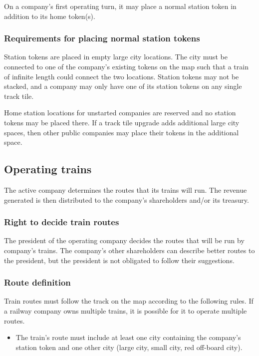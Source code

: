 \documentclass{article}
\begin{document}
\begin{CJK}{UTF8}{min}
\begin{multicols}{2}
On a company's first operating turn, it may place a normal station
token in addition to its home token(s).

\subsubsection{Requirements for placing normal station tokens}
\label{or-station-placement-requirements}
Station tokens are placed in empty large city locations. The city must
be connected to one of the company's existing tokens on the map such
that a train of infinite length could connect the two
locations. Station tokens may not be stacked, and a company may only
have one of its station tokens on any single track tile.

Home station locations for unstarted companies are reserved and no
station tokens may be placed there. If a track tile upgrade adds
additional large city spaces, then other public companies may place
their tokens in the additional space.

\subsection{Operating trains}
The active company determines the routes that its trains will run. The
revenue generated is then distributed to the company's shareholders
and/or its treasury.

\subsubsection{Right to decide train routes} \label{or-route-choice}
The president of the operating company decides the routes that will be
run by company's trains. The company's other shareholders can describe
better routes to the president, but the president is not obligated to
follow their suggestions.

\subsubsection{Route definition} \label{or-route-definition}
Train routes must follow the track on the map according to the
following rules. If a railway company owns multiple trains, it is
possible for it to operate multiple routes.
\begin{itemize}
\item The train's route must include at least one city containing the
  company's station token and one other city (large city, small city,
  red off-board city).


\end{itemize}
\end{multicols}
\end{CJK}
\end{document}
